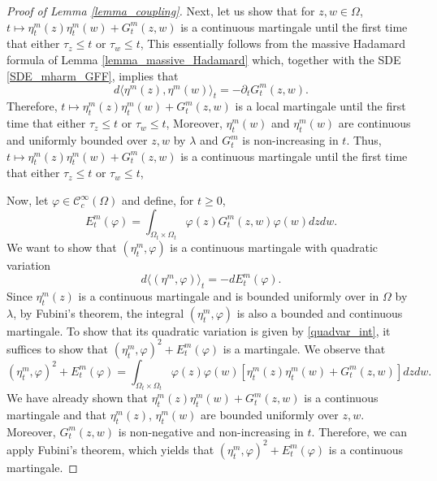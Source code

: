 \documentclass{article}
\theoremstyle{definition}
\theoremstyle{remark}
\theoremstyle{remark}
\begin{document}
\begin{proof}[Proof of Lemma \ref{lemma_coupling}]
    Next, let us show that for $z, w \in \Omega$, $t \mapsto \eta_t^{m}(z) \eta_t^{m}(w) + G_{t}^{m}(z,w)$ is a continuous martingale until the first time that either $\tau_z \leq t$ or $\tau_w \leq t$, This essentially follows from the massive Hadamard formula of Lemma \ref{lemma_massive_Hadamard} which, together with the SDE \eqref{SDE_mharm_GFF}, implies that
    \begin{equation*}
        d\langle \eta^{m}(z), \eta^{m}(w) \rangle_t = -\partial_t G_t^{m}(z,w).
    \end{equation*}
    Therefore, $t \mapsto \eta_t^{m}(z) \eta_t^{m}(w) + G_{t}^{m}(z,w)$ is a local martingale until the first time that either $\tau_z \leq t$ or $\tau_w \leq t$, Moreover, $\eta_t^{m}(w)$ and $\eta_t^{m}(w)$ are continuous and uniformly bounded over $z,w$ by $\lambda$ and $G_t^{m}$ is non-increasing in $t$. Thus, $t \mapsto \eta_t^{m}(z) \eta_t^{m}(w) + G_{t}^{m}(z,w)$ is a continuous martingale until the first time that either $\tau_z \leq t$ or $\tau_w \leq t$,

    Now, let $\varphi \in \mathcal{C}_c^{\infty}(\Omega)$ and define, for $t \geq 0$,
    \begin{equation*}
        E_t^m(\varphi) = \int_{\Omega_t \times \Omega_t} \varphi(z) G_t^{m}(z,w) \varphi(w) dz dw.
    \end{equation*}
    We want to show that $(\eta_t^{m},\varphi)$ is a continuous martingale with quadratic variation
    \begin{equation} \label{quadvar_int}
        d\langle (\eta^{m}, \varphi) \rangle_t = -dE_t^m(\varphi).
    \end{equation}
    Since $\eta_t^{m}(z)$ is a continuous martingale and is bounded uniformly over in $\Omega$ by $\lambda$, by Fubini's theorem, the integral $(\eta_t^{m}, \varphi)$ is also a bounded and continuous martingale. To show that its quadratic variation is given by \eqref{quadvar_int}, it suffices to show that $(\eta_t^{m}, \varphi)^2 + E_t^m(\varphi)$ is a martingale. We observe that
    \begin{equation*}
        (\eta_t^{m}, \varphi)^2 + E_t^m(\varphi) = \int_{\Omega_t \times \Omega_t} \varphi(z) \varphi(w) [\eta_t^{m}(z) \eta_t^{m}(w) + G_t^{m}(z,w)] dz dw.
    \end{equation*}
    We have already shown that $\eta_t^{m}(z) \eta_t^{m}(w) + G_t^{m}(z,w)$ is a continuous martingale and that $\eta_t^{m}(z)$, $\eta_t^{m}(w)$ are bounded uniformly over $z,w$. Moreover, $G_t^m(z,w)$ is non-negative and non-increasing in $t$. Therefore, we can apply Fubini's theorem, which yields that $(\eta_t^{m}, \varphi)^2 + E_t^m(\varphi)$ is a continuous martingale.


\end{proof}
\end{document}
